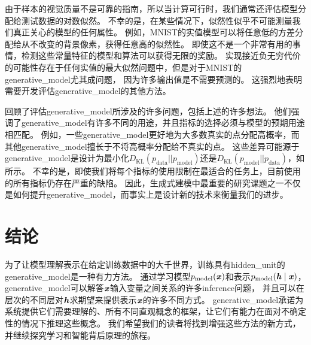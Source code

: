 
由于样本的视觉质量不是可靠的指南，所以当计算可行时，我们通常还评估模型分配给测试数据的对数似然。
不幸的是，在某些情况下，似然性似乎不可能测量我们真正关心的模型的任何属性。
例如，MNIST的实值模型可以将任意低的方差分配给从不改变的背景像素，获得任意高的似然性。
即使这不是一个非常有用的事情，检测这些常量特征的模型和算法可以获得无限的奖励。
实现接近负无穷代价的可能性存在于任何实值的最大似然问题中，但是对于MNIST的\gls{generative_model}尤其成问题， 因为许多输出值是不需要预测的。
这强烈地表明需要开发评估\gls{generative_model}的其他方法。


\citet{Theis2015d} 回顾了评估\gls{generative_model}所涉及的许多问题，包括上述的许多想法。
他们强调了\gls{generative_model}有许多不同的用途，并且指标的选择必须与模型的预期用途相匹配。
例如，一些\gls{generative_model}更好地为大多数真实的点分配高概率，而其他\gls{generative_model}擅长于不将高概率分配给不真实的点。
这些差异可能源于\gls{generative_model}是设计为最小化$D_{\text{KL}}(p_{\text{data}} || p_{\text{model}})$还是$D_{\text{KL}}(p_{\text{model}} || p_{\text{data}})$，如所示。
不幸的是，即使我们将每个指标的使用限制在最适合的任务上，目前使用的所有指标仍存在严重的缺陷。
因此，生成式建模中最重要的研究课题之一不仅是如何提升\gls{generative_model}，而事实上是设计新的技术来衡量我们的进步。


\section{结论}
\label{sec:conclusion}

为了让模型理解表示在给定训练数据中的大千世界，训练具有\gls{hidden_unit}的\gls{generative_model}是一种有力方法。
通过学习模型$p_{\text{model}}(\boldsymbol{\mathit{x}})$和表示$p_{\text{model}}(\boldsymbol{\mathit{h}}  \mid  \boldsymbol{\mathit{x}})$，\gls{generative_model}可以解答$\boldsymbol{\mathit{x}}$输入变量之间关系的许多\gls{inference}问题， 并且可以在层次的不同层对$\boldsymbol{\mathit{h}}$求期望来提供表示$\boldsymbol{\mathit{x}}$的许多不同方式。
\gls{generative_model}承诺为系统提供它们需要理解的、所有不同直观概念的框架，让它们有能力在面对不确定性的情况下推理这些概念。
我们希望我们的读者将找到增强这些方法的新方式，并继续探究学习和智能背后原理的旅程。
